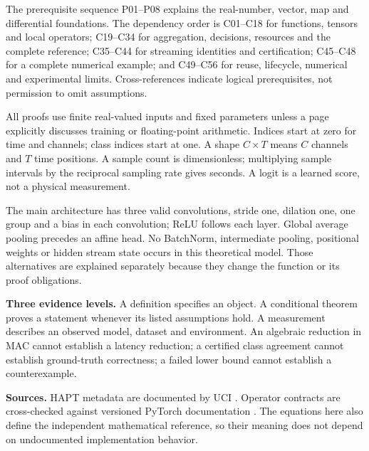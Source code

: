 \documentclass[11pt,a4paper]{article}
\newcommand{\conceptid}{Reading guide}
\begin{document}
The prerequisite sequence P01--P08 explains the real-number, vector, map and differential foundations. The dependency order is C01--C18 for functions, tensors and local operators; C19--C34 for aggregation, decisions, resources and the complete reference; C35--C44 for streaming identities and certification; C45--C48 for a complete numerical example; and C49--C56 for reuse, lifecycle, numerical and experimental limits. Cross-references indicate logical prerequisites, not permission to omit assumptions.

All proofs use finite real-valued inputs and fixed parameters unless a page explicitly discusses training or floating-point arithmetic. Indices start at zero for time and channels; class indices start at one. A shape $C\times T$ means $C$ channels and $T$ time positions. A sample count is dimensionless; multiplying sample intervals by the reciprocal sampling rate gives seconds. A logit is a learned score, not a physical measurement.

The main architecture has three valid convolutions, stride one, dilation one, one group and a bias in each convolution; ReLU follows each layer. Global average pooling precedes an affine head. No BatchNorm, intermediate pooling, positional weights or hidden stream state occurs in this theoretical model. Those alternatives are explained separately because they change the function or its proof obligations.

\textbf{Three evidence levels.} A definition specifies an object. A conditional theorem proves a statement whenever its listed assumptions hold. A measurement describes an observed model, dataset and environment. An algebraic reduction in MAC cannot establish a latency reduction; a certified class agreement cannot establish ground-truth correctness; a failed lower bound cannot establish a counterexample.

\textbf{Sources.} HAPT metadata are documented by UCI \cite{hapt}. Operator contracts are cross-checked against versioned PyTorch documentation \cite{torchconv,torchgap,torchce,torchbn,torchnumerical}. The equations here also define the independent mathematical reference, so their meaning does not depend on undocumented implementation behavior.
\clearpage
\gdef\conceptid{Contents}
\begingroup\small\setlength{\parskip}{0pt}\tableofcontents\endgroup
\end{document}
